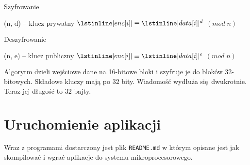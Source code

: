 \documentclass[12pt]{article}
\begin{document}
		\begin{algorithm}[H]
			\caption{Szyfrowanie}
			\begin{algorithmic}[1]
				\State (n, d) -- klucz prywatny
				\State $\lstinline|enc[i]| \equiv \lstinline|data[i]|^d$ $(mod \; n)$
				\EndFor
				\EndFunction
			\end{algorithmic}
		\end{algorithm}
		
		\begin{algorithm}[H]
			\caption{Deszyfrowanie}
			\begin{algorithmic}[1]
				\State (n, e) -- klucz publiczny
				\State $\lstinline|enc[i]| \equiv \lstinline|data[i]|^e$ $(mod \; n)$
				\EndFor
				\EndFunction
			\end{algorithmic}
		\end{algorithm}
		
	 	Algorytm dzieli wejściowe dane na 16-bitowe bloki i szyfruje je do bloków 32-bitowych. Składowe kluczy mają po 32 bity. Wiadomość wydłuża się dwukrotnie. Teraz jej długość to 32 bajty.
	 	
	 \section{Uruchomienie aplikacji}
	 	Wraz z programami dostarczony jest plik \lstinline|README.md| w którym opisane jest jak skompilować i wgrać aplikacje do systemu mikroprocesorowego.

	 
\end{document}
